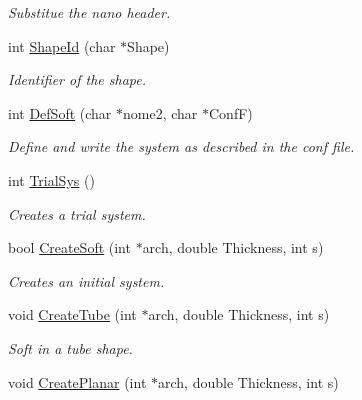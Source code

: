 \begin{DoxyCompactItemize}
\begin{DoxyCompactList}\small\item\em Substitue the nano header. \end{DoxyCompactList}\item 
int \hyperlink{classVarData_aa5eca7387a47bfde4d54ef7ec03b1dc1}{Shape\+Id} (char $\ast$Shape)\hypertarget{classVarData_aa5eca7387a47bfde4d54ef7ec03b1dc1}{}\label{classVarData_aa5eca7387a47bfde4d54ef7ec03b1dc1}

\begin{DoxyCompactList}\small\item\em Identifier of the shape. \end{DoxyCompactList}\item 
int \hyperlink{classVarData_a82c7f45c23289466fed080c06d340974}{Def\+Soft} (char $\ast$nome2, char $\ast$ConfF)\hypertarget{classVarData_a82c7f45c23289466fed080c06d340974}{}\label{classVarData_a82c7f45c23289466fed080c06d340974}

\begin{DoxyCompactList}\small\item\em Define and write the system as described in the conf file. \end{DoxyCompactList}\item 
int \hyperlink{classVarData_a918d18dfd9211a136328803d3a64a0e4}{Trial\+Sys} ()\hypertarget{classVarData_a918d18dfd9211a136328803d3a64a0e4}{}\label{classVarData_a918d18dfd9211a136328803d3a64a0e4}

\begin{DoxyCompactList}\small\item\em Creates a trial system. \end{DoxyCompactList}\item 
bool \hyperlink{classVarData_a7e93821c1a3e32096733330e9e66c959}{Create\+Soft} (int $\ast$arch, double Thickness, int s)\hypertarget{classVarData_a7e93821c1a3e32096733330e9e66c959}{}\label{classVarData_a7e93821c1a3e32096733330e9e66c959}

\begin{DoxyCompactList}\small\item\em Creates an initial system. \end{DoxyCompactList}\item 
void \hyperlink{classVarData_a79507647da2b91453687857ab20beb34}{Create\+Tube} (int $\ast$arch, double Thickness, int s)\hypertarget{classVarData_a79507647da2b91453687857ab20beb34}{}\label{classVarData_a79507647da2b91453687857ab20beb34}

\begin{DoxyCompactList}\small\item\em Soft in a tube shape. \end{DoxyCompactList}\item 
void \hyperlink{classVarData_a5eba4428e8514fc9034e40fef8c81b91}{Create\+Planar} (int $\ast$arch, double Thickness, int s)\hypertarget{classVarData_a5eba4428e8514fc9034e40fef8c81b91}{}\label{classVarData_a5eba4428e8514fc9034e40fef8c81b91}


\end{DoxyCompactItemize}
